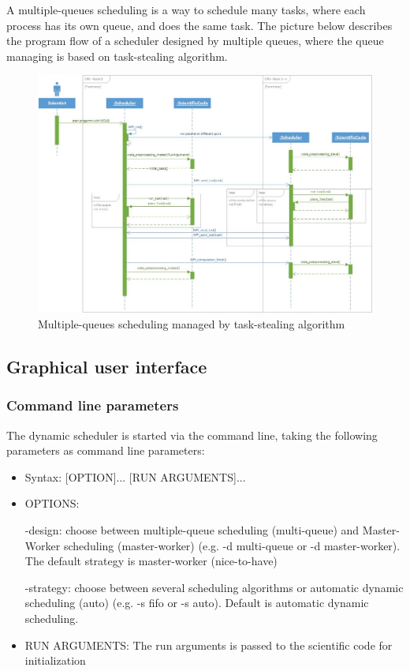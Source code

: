 \vspace{0.5cm}
A multiple-queues scheduling is a way to schedule many tasks, where each process has its own queue, and does the same task. The picture below describes the program flow of a scheduler designed by multiple queues, where the queue managing is based on task-stealing algorithm.
\vspace{1cm}
	\begin{figure}[H]
	\centering
	\includegraphics[width=15cm]{images/Task-stealing.jpg}
	\caption{Multiple-queues scheduling managed by task-stealing algorithm}
	\end{figure}
\newpage
	
\subsection{Graphical user interface}
	\subsubsection{Command line parameters}
		The dynamic scheduler is started via the command line, taking the following parameters as command line parameters:
	
		\begin{itemize}	
			\item Syntax: [OPTION]... [RUN ARGUMENTS]...
				
			\item OPTIONS:
							
				\subitem -design: choose between multiple-queue scheduling (multi-queue) and Master-Worker scheduling (master-worker) (e.g. -d multi-queue or -d master-worker). The default strategy is master-worker (nice-to-have)
				
				\subitem -strategy: choose between several scheduling algorithms or automatic dynamic scheduling (auto) (e.g. -s fifo or -s auto). Default is automatic dynamic scheduling.
					
			\item RUN ARGUMENTS:
				\subitem The run arguments is passed to the scientific code for initialization
		\end{itemize}
		
